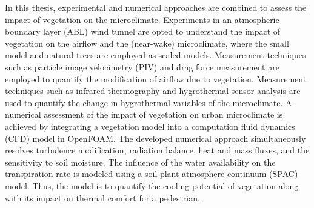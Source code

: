 
In this thesis, experimental and numerical approaches are combined to assess the impact of vegetation on the microclimate. Experiments in an atmospheric boundary layer (ABL) wind tunnel are opted to understand the impact of vegetation on the airflow and the (near-wake) microclimate, where the small model and natural trees are employed as scaled models. Measurement techniques such as particle image velocimetry (PIV) and drag force measurement are employed to quantify the modification of airflow due to vegetation. Measurement techniques such as infrared thermography and hygrothermal sensor analysis are used to quantify the change in hygrothermal variables of the microclimate. A numerical assessment of the impact of vegetation on urban microclimate is achieved by integrating a vegetation model into a computation fluid dynamics (CFD) model in OpenFOAM. The developed numerical approach simultaneously resolves turbulence modification, radiation balance, heat and mass fluxes, and the sensitivity to soil moisture. The influence of the water availability on the transpiration rate is modeled using a soil-plant-atmosphere continuum (SPAC) model.  Thus, the model is to quantify the cooling potential of vegetation along with its impact on thermal comfort for a pedestrian.

